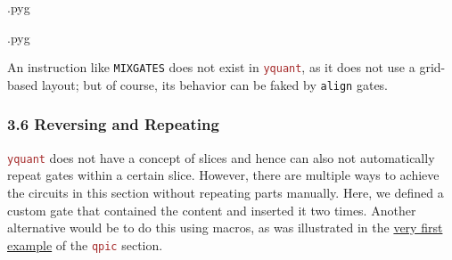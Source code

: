 \documentclass{scrartcl}
\makeatletter
\newenvironment{codeexample}{%
   \VerbatimEnvironment%
   \let\FVB@VerbatimOut\minted@FVB@VerbatimOut
   \let\FVE@VerbatimOut\minted@FVE@VerbatimOut
   \minted@configlang{tex}%
   \minted@fvset
   \begin{VerbatimOut}[codes={\catcode`\^^I=12},firstline,lastline]{\minted@jobname.pyg}%
}{
   \end{VerbatimOut}%
   \minted@langlinenoson%
   \savebox\codeexamplebox{ \minted@jobname.pyg}%
   \ifdim\wd\codeexamplebox>\dimexpr.5\linewidth-3mm\relax%
      \wd\codeexamplebox=.5\linewidth%
   \else%
      \wd\codeexamplebox=\dimexpr\wd\codeexamplebox+3mm\relax%
   \fi%
   \noindent\begin{minipage}{\wd\codeexamplebox}%
      \centering%
      \usebox\codeexamplebox%
   \end{minipage}%
   \begin{minipage}{\dimexpr\linewidth-\wd\codeexamplebox\relax}%
      \expandafter\minted@pygmentize\expandafter{\minted@lang}%
   \end{minipage}%
   \minted@langlinenosoff%
   \par%
}
\newenvironment{codeexample*}{%
   \VerbatimEnvironment%
   \let\FVB@VerbatimOut\minted@FVB@VerbatimOut
   \let\FVE@VerbatimOut\minted@FVE@VerbatimOut
   \minted@configlang{tex}%
   \minted@fvset
   \begin{VerbatimOut}[codes={\catcode`\^^I=12},firstline,lastline]{\minted@jobname.pyg}%
}{
   \end{VerbatimOut}%
   \minted@langlinenoson%
   \begin{adjustbox}{center}
       \minted@jobname.pyg %
   \end{adjustbox}\nopagebreak
   \expandafter\minted@pygmentize\expandafter{\minted@lang}%
   \minted@langlinenosoff%
   \par%
}
\def\pkg#1{\textcolor{brown}{\texttt{#1}}}
\def\ttlink{\link\texttt}
\def\Yquant{\pkg{yquant}}
\makeatother
\begin{document}
            \begin{example}
               \begin{codeexample}
               \end{codeexample}
            \end{example}

            \begin{example}
               \begin{codeexample}
               \end{codeexample}
               An instruction like \texttt{MIXGATES} does not exist in \Yquant, as it does not use a grid\hyp based layout; but of course, its behavior can be faked by \ttlink{align} gates.
            \end{example}

         \clearpage
         \subsubsection{3.6 Reversing and Repeating}
            \begin{example}
               \begin{codeexample*}
               \end{codeexample*}
               \Yquant{} does not have a concept of slices and hence can also not automatically repeat gates within a certain slice.
               However, there are multiple ways to achieve the circuits in this section without repeating parts manually.
               Here, we defined a custom gate that contained the content and inserted it two times.
               Another alternative would be to do this using macros, as was illustrated in the \hyperref[ex:qupicfirst]{very first example} of the \pkg{qpic} section.
            \end{example}
\end{document}
